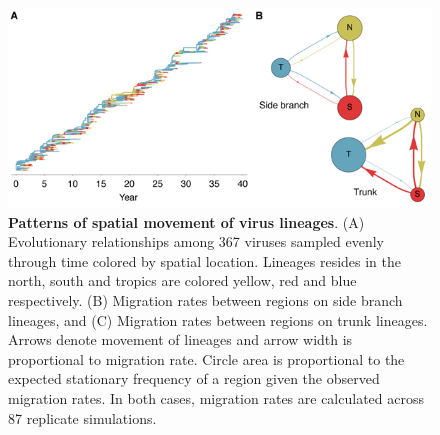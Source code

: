 \documentclass[11pt,oneside,letterpaper]{article}
\begin{document}
\begin{figure}[H]
	\centering
	\includegraphics{figures/spatial}
	\caption{\textbf{Patterns of spatial movement of virus lineages}. (A) Evolutionary relationships among 367 viruses sampled evenly through time colored by spatial location. Lineages resides in the north, south and tropics are colored yellow, red and blue respectively. (B) Migration rates between regions on side branch lineages, and (C) Migration rates between regions on trunk lineages. Arrows denote movement of lineages and arrow width is proportional to migration rate. Circle area is proportional to the expected stationary frequency of a region given the observed migration rates.  In both cases, migration rates are calculated across 87 replicate simulations.}
	\label{spatial}
\end{figure}
\end{document}
